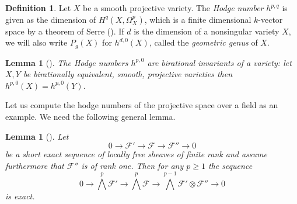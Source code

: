 \documentclass[11pt, a4paper, english, twoside]{article}
\theoremstyle{plain}
\newtheorem{lemma}[theorem]{Lemma}
\theoremstyle{definition}
\newtheorem{definition}[theorem]{Definition}
\begin{document}
\begin{definition}
    Let $X$ be a smooth projective variety. The \emph{Hodge number} $h^{p,q}$ is given as the dimension of $H^q(X,\Omega^p_X)$, 
    which is a finite dimensional $k$-vector space by a theorem of Serre (\cite[§3 Prop. 7]{FAC}).
    If $d$ is the dimension of a nonsingular variety $X$, we will also write $P_g(X)$ for $h^{d,0}(X)$, called the \emph{geometric genus} of $X$.
\end{definition}


\begin{lemma}[{\cite[II Ex. 8.8]{Ha}}]
    \label{bir}
    The Hodge numbers $h^{p,0}$ are birational invariants of a variety: let $X, Y$ be birationally equivalent, smooth, projective varieties
    then $h^{p,0}(X) = h^{p,0}(Y)$.
\end{lemma}


Let us compute the hodge numbers of the projective space over a field as an example.
We need the following general lemma.

\begin{lemma}[{\cite[Thm.\ 4.1.3*]{hirz}}]
    \label{ses}
    Let 
    \[
        0 \to \mathcal{F}' \to \mathcal{F} \to \mathcal{F}'' \to 0
    \]
    be a short exact sequence of locally free sheaves of finite rank and assume furthermore that $\mathcal{F}''$ is of rank one.
    Then for any $p \ge 1$ the sequence
    \[
        0 \to {\bigwedge}^p \mathcal{F}' \to {\bigwedge}^p \mathcal{F} \to {\bigwedge}^{p-1} \mathcal{F}' \otimes \mathcal{F}'' \to 0
    \]
    is exact.
\end{lemma}
\end{document}
